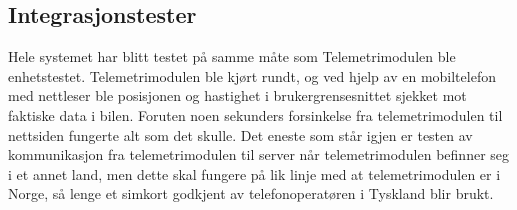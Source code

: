\subsection{Integrasjonstester}
Hele systemet har blitt testet på samme måte som Telemetrimodulen ble enhetstestet. Telemetrimodulen ble kjørt rundt, og ved hjelp av en mobiltelefon med nettleser ble posisjonen og hastighet i brukergrensesnittet sjekket mot faktiske data i bilen.
Foruten noen sekunders forsinkelse fra telemetrimodulen til nettsiden fungerte alt som det skulle. Det eneste som står igjen er testen av kommunikasjon fra telemetrimodulen til server når telemetrimodulen befinner seg i et annet land, men dette skal fungere på lik linje med at telemetrimodulen er i Norge, så lenge et simkort godkjent av telefonoperatøren i Tyskland blir brukt.